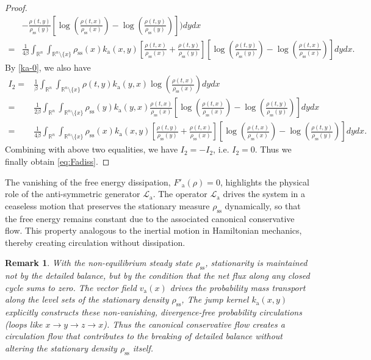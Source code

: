 \documentclass[10pt]{article}
\newtheorem{remark}{Remark}[section]
\theoremstyle{definition}
\numberwithin{equation}{section}
\begin{document}
\begin{proof}
\begin{align*}
     &- \frac{\rho(t,y)}{\rho_\mathrm{ss}(y)}   \left[ \log \left( \frac{\rho(t,x) }{\rho_\mathrm{ss}(x)} \right) - \log \left( \frac{\rho(t,y) }{\rho_\mathrm{ss}(y)} \right) \right] \Bigg) dydx \nonumber\\
     =& \frac{1}{4\beta}\int_{\mathbb{R}^n}\int_{\mathbb{R}^n \setminus \{x\}} \rho_\mathrm{ss}(x)k_\mathrm{a}(x,y) \left[ \frac{\rho(t,x)}{\rho_\mathrm{ss}(x)} + \frac{\rho(t,y)}{\rho_\mathrm{ss}(y)} \right]  \left[  \log \left( \frac{\rho(t,y) }{\rho_\mathrm{ss}(y)} \right) - \log \left( \frac{\rho(t,x) }{\rho_\mathrm{ss}(x)} \right) \right] dydx.
\end{align*}
By \eqref{ka-0}, we also have
\begin{align}
    I_2 =& \frac{1}{\beta}\int_{\mathbb{R}^n}\int_{\mathbb{R}^n \setminus \{x\}} \rho(t,y)k_\mathrm{a}(y,x) \log \left( \frac{\rho(t,x) }{\rho_\mathrm{ss}(x)} \right) dydx \nonumber\\
    = &  \frac{1}{2\beta}\int_{\mathbb{R}^n}\int_{\mathbb{R}^n \setminus \{x\}} \rho_\mathrm{ss}(y)k_\mathrm{a}(y,x) \frac{\rho(t,x)}{\rho_\mathrm{ss}(x)} \left[ \log \left( \frac{\rho(t,x)}{\rho_\mathrm{ss}(x) } \right) - \log \left( \frac{\rho(t,y)}{\rho_\mathrm{ss}(y)} \right) \right] dydx \nonumber \\
    = &   \frac{1}{4\beta}\int_{\mathbb{R}^n}\int_{\mathbb{R}^n \setminus \{x\}} \rho_\mathrm{ss}(x)k_\mathrm{a}(x,y) \left[ \frac{\rho(t,y)}{\rho_\mathrm{ss}(y)} + \frac{\rho(t,x)}{\rho_\mathrm{ss}(x)}  \right]  \left[ \log \left( \frac{\rho(t,x)}{\rho_\mathrm{ss}(x) } \right) - \log \left( \frac{\rho(t,y)}{\rho_\mathrm{ss}(y) } \right) \right] dydx.
\end{align}
Combining with above two equalities, we have $I_2 = -I_2$, i.e. $I_2 = 0$. Thus we finally obtain \eqref{eq:Fadiss}.
\end{proof}


The vanishing of the free energy dissipation, $F'_\mathrm{a}(\rho) = 0$, highlights the physical role of the anti-symmetric generator $\mathcal{L}_\mathrm{a}$. 
The operator $\mathcal{L}_\mathrm{a}$ drives the system in a ceaseless motion that preserves the stationary measure $\rho_\mathrm{ss}$ dynamically, 
so that the free energy remains constant due to the associated canonical conservative flow.
This property analogous to the inertial motion in Hamiltonian mechanics, thereby creating circulation without dissipation.

\begin{remark}
With the non-equilibrium steady state $\rho_\mathrm{ss}$, stationarity is maintained not by the detailed balance, but by the condition that the net flux along any closed cycle sums to zero. 
The vector field $v_\mathrm{a}(x)$ drives the probability mass transport along the level sets of the stationary density $\rho_\mathrm{ss}$, 
The jump kernel $k_\mathrm{a}(x,y)$ explicitly constructs these non-vanishing, divergence-free probability circulations (loops like $x \to y \to z \to x$).
Thus the canonical conservative flow creates a circulation flow that contributes to the breaking of detailed balance without altering the stationary density $\rho_\mathrm{ss}$ itself.
\end{remark}
\end{document}
